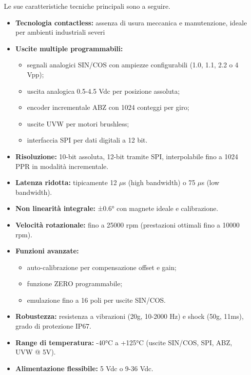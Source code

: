 Le sue caratteristiche tecniche principali sono a seguire.
\begin{itemize}
    \item \textbf{Tecnologia contactless:} assenza di usura meccanica e manutenzione, ideale per ambienti industriali severi
    \item \textbf{Uscite multiple programmabili:}
          \begin{itemize}
              \item segnali analogici SIN/COS con ampiezze configurabili (1.0, 1.1, 2.2 o 4 Vpp);
              \item uscita analogica 0.5-4.5 Vdc per posizione assoluta;
              \item encoder incrementale ABZ con 1024 conteggi per giro;
              \item uscite UVW per motori brushless;
              \item interfaccia SPI per dati digitali a 12 bit.
          \end{itemize}
    \item \textbf{Risoluzione:} 10-bit assoluta, 12-bit tramite SPI, interpolabile fino a 1024 PPR in modalità incrementale.
    \item \textbf{Latenza ridotta:} tipicamente 12 $\mu$s (high bandwidth) o 75 $\mu$s (low bandwidth).
    \item \textbf{Non linearità integrale:} ±0.6° con magnete ideale e calibrazione.
    \item \textbf{Velocità rotazionale:} fino a 25000 rpm (prestazioni ottimali fino a 10000 rpm).
    \item \textbf{Funzioni avanzate:}
          \begin{itemize}
              \item auto-calibrazione per compensazione offset e gain;
              \item funzione ZERO programmabile;
              \item emulazione fino a 16 poli per uscite SIN/COS.
          \end{itemize}
    \item \textbf{Robustezza:} resistenza a vibrazioni (20g, 10-2000 Hz) e shock (50g, 11ms), grado di protezione IP67.
    \item \textbf{Range di temperatura:} -40°C a +125°C (uscite SIN/COS, SPI, ABZ, UVW @ 5V).
    \item \textbf{Alimentazione flessibile:} 5 Vdc o 9-36 Vdc.
\end{itemize}

